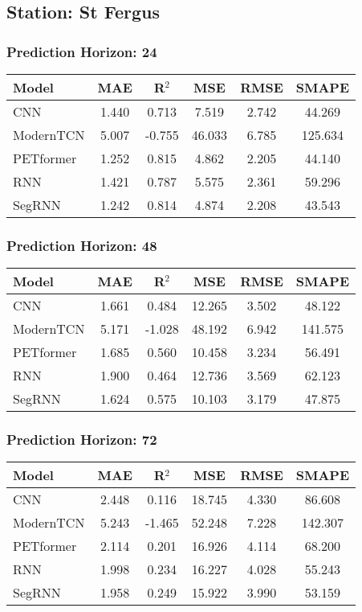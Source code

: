 \subsection*{Station: St Fergus}
\subsubsection*{Prediction Horizon: 24}
\begin{tabular}{lccccc}
\toprule
Model & MAE & R$^2$ & MSE & RMSE & SMAPE \\
\midrule
CNN & 1.440 & 0.713 & 7.519 & 2.742 & 44.269 \\
ModernTCN & 5.007 & -0.755 & 46.033 & 6.785 & 125.634 \\
PETformer & 1.252 & 0.815 & 4.862 & 2.205 & 44.140 \\
RNN & 1.421 & 0.787 & 5.575 & 2.361 & 59.296 \\
SegRNN & 1.242 & 0.814 & 4.874 & 2.208 & 43.543 \\
\bottomrule
\end{tabular}
\vspace{0.5cm}
\subsubsection*{Prediction Horizon: 48}
\begin{tabular}{lccccc}
\toprule
Model & MAE & R$^2$ & MSE & RMSE & SMAPE \\
\midrule
CNN & 1.661 & 0.484 & 12.265 & 3.502 & 48.122 \\
ModernTCN & 5.171 & -1.028 & 48.192 & 6.942 & 141.575 \\
PETformer & 1.685 & 0.560 & 10.458 & 3.234 & 56.491 \\
RNN & 1.900 & 0.464 & 12.736 & 3.569 & 62.123 \\
SegRNN & 1.624 & 0.575 & 10.103 & 3.179 & 47.875 \\
\bottomrule
\end{tabular}
\vspace{0.5cm}
\subsubsection*{Prediction Horizon: 72}
\begin{tabular}{lccccc}
\toprule
Model & MAE & R$^2$ & MSE & RMSE & SMAPE \\
\midrule
CNN & 2.448 & 0.116 & 18.745 & 4.330 & 86.608 \\
ModernTCN & 5.243 & -1.465 & 52.248 & 7.228 & 142.307 \\
PETformer & 2.114 & 0.201 & 16.926 & 4.114 & 68.200 \\
RNN & 1.998 & 0.234 & 16.227 & 4.028 & 55.243 \\
SegRNN & 1.958 & 0.249 & 15.922 & 3.990 & 53.159 \\
\bottomrule
\end{tabular}
\vspace{0.5cm}
